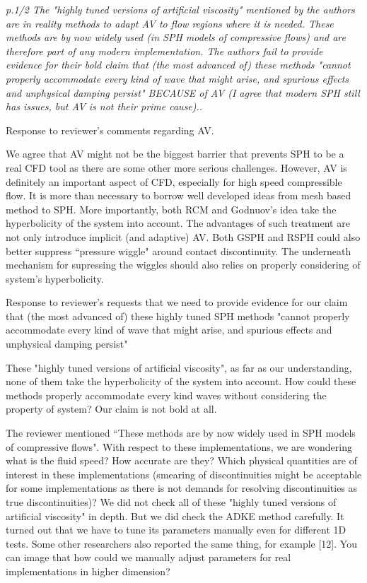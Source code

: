 \documentclass[10pt,a4paper]{article}
\begin{document}
\textit{p.1/2 The "highly tuned versions of artificial viscosity" mentioned by the authors are in reality methods to adapt AV to flow regions where it is needed. These methods are by now widely used (in SPH models of compressive flows) and are therefore part of any modern implementation.
The authors fail to provide evidence for their bold claim that (the most advanced of) these methods "cannot properly accommodate every kind of wave that might arise, and spurious effects and unphysical damping persist" BECAUSE of AV (I agree that modern SPH still has issues, but AV is not their prime cause)..}

Response to reviewer's comments regarding AV.

We agree that AV might not be the biggest barrier that prevents SPH to be a real CFD tool as there are some other more serious challenges. However, AV is definitely an important aspect of CFD, especially for high speed compressible flow. It is more than necessary to borrow well developed ideas from mesh based method to SPH.
More importantly, both RCM and Godnuov's idea take the hyperbolicity of the system into account. The advantages of such treatment are not only introduce implicit (and adaptive) AV. Both GSPH and RSPH could also better suppress ``pressure wiggle" around contact discontinuity. The underneath mechanism for supressing the wiggles should also relies on properly considering of system's hyperbolicity.

Response to reviewer's requests that we need to provide evidence for our claim that (the most advanced of) these highly tuned SPH methods "cannot properly accommodate every kind of wave that might arise, and spurious effects and unphysical damping persist"

These "highly tuned versions of artificial viscosity", as far as our understanding, none of them take the hyperbolicity of the system into account. How could these methods properly accommodate every kind waves without considering the property of system? Our claim is not bold at all.

The reviewer mentioned ``These methods are by now widely used in SPH models of compressive flows". With respect to these implementations, we are wondering what is the fluid speed? How accurate are they? Which physical quantities are of interest in these implementations (smearing of discontinuities might be acceptable for some implementations as there is not demands for resolving discontinuities as true discontinuities)?
We did not check all of these "highly tuned versions of artificial viscosity" in depth. But we did check the ADKE method carefully. It turned out that we have to tune its parameters manually even for different 1D tests. Some other researchers also reported the same thing, for example [12]. You can image that how could we manually adjust parameters for real implementations in higher dimension?
\\[3pt]
 
\end{document}
